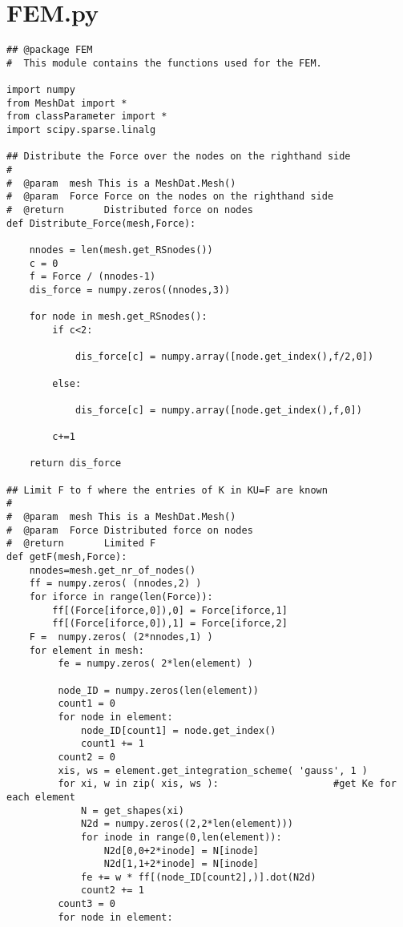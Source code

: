 \begin{appendices}
\begin{verbatim}
\end{verbatim}

\section{FEM.py}
\begin{verbatim}
## @package FEM
#  This module contains the functions used for the FEM.

import numpy
from MeshDat import *
from classParameter import *
import scipy.sparse.linalg

## Distribute the Force over the nodes on the righthand side
#
#  @param  mesh This is a MeshDat.Mesh()
#  @param  Force Force on the nodes on the righthand side
#  @return       Distributed force on nodes
def Distribute_Force(mesh,Force):
    
    nnodes = len(mesh.get_RSnodes())
    c = 0
    f = Force / (nnodes-1)
    dis_force = numpy.zeros((nnodes,3))
    
    for node in mesh.get_RSnodes():
        if c<2:
        
            dis_force[c] = numpy.array([node.get_index(),f/2,0])
            
        else:
            
            dis_force[c] = numpy.array([node.get_index(),f,0])
        
        c+=1
        
    return dis_force

## Limit F to f where the entries of K in KU=F are known
#
#  @param  mesh This is a MeshDat.Mesh()
#  @param  Force Distributed force on nodes
#  @return       Limited F
def getF(mesh,Force):
    nnodes=mesh.get_nr_of_nodes()
    ff = numpy.zeros( (nnodes,2) )
    for iforce in range(len(Force)):
        ff[(Force[iforce,0]),0] = Force[iforce,1]
        ff[(Force[iforce,0]),1] = Force[iforce,2]
    F =  numpy.zeros( (2*nnodes,1) )
    for element in mesh:
         fe = numpy.zeros( 2*len(element) )

         node_ID = numpy.zeros(len(element))
         count1 = 0
         for node in element:
             node_ID[count1] = node.get_index()
             count1 += 1
         count2 = 0
         xis, ws = element.get_integration_scheme( 'gauss', 1 )
         for xi, w in zip( xis, ws ):                    #get Ke for each element
             N = get_shapes(xi)
             N2d = numpy.zeros((2,2*len(element)))
             for inode in range(0,len(element)):
                 N2d[0,0+2*inode] = N[inode]
                 N2d[1,1+2*inode] = N[inode]
             fe += w * ff[(node_ID[count2],)].dot(N2d)
             count2 += 1
         count3 = 0
         for node in element:


\end{verbatim}
\end{appendices}
